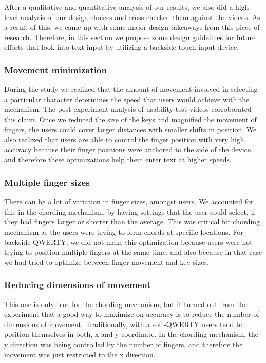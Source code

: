 After a qualitative and quantitative analysis of our results, we also did a high-level analysis of our design choices and cross-checked them against the videos. As a result of this, we came up with some major design takeaways from this piece of research. Therefore, in this section we propose some design guidelines for future efforts that look into text input by utilizing a backside touch input device. 

\subsubsection{Movement minimization}

During the study we realized that the amount of movement involved in selecting a particular character determines the speed that users would achieve with the mechanism. The post-experiment analysis of usability test videos corroborated this claim. Once we reduced the size of the keys and magnified the movement of fingers, the users could cover larger distances with smaller shifts in position. We also realized that users are able to control the finger position with very high accuracy because their finger positions were anchored to the side of the device, and therefore these optimizations help them enter text at higher speeds.

\subsubsection{Multiple finger sizes}

There can be a lot of variation in finger sizes, amongst users. We accounted for this in the chording mechanism, by having settings that the user could select, if they had fingers larger or shorter than the average. This was critical for chording mechanism as the users were trying to form chords at specific locations. For backside-QWERTY, we did not make this optimization because users were not trying to position multiple fingers at the same time, and also because in that case we had tried to optimize between finger movement and key sizes.

\subsubsection{Reducing dimensions of movement}

This one is only true for the chording mechanism, but it turned out from the experiment that a good way to maximize on accuracy is to reduce the number of dimensions of movement. Traditionally, with a soft-QWERTY users tend to position themselves in both, x and y coordinate. In the chording mechanism, the y direction was being controlled by the number of fingers, and therefore the movement was just restricted to the x direction.

